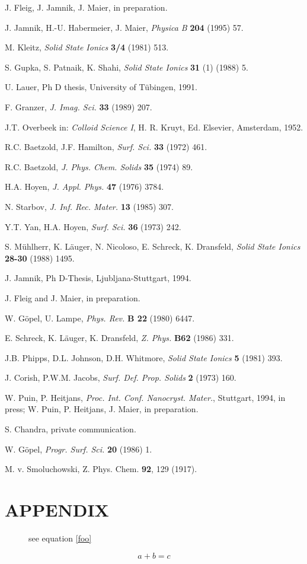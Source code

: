 \documentclass{elsart}
\begin{document}
\begin{thebibliography}{999}
 J. Fleig, J. Jamnik, J. Maier, in preparation. 

 J. Jamnik, H.-U. Habermeier, J. Maier, {\em Physica B\/} {\bf
    204} (1995) 57.   

 M. Kleitz, {\em Solid State Ionics\/} {\bf 3/4} (1981) 513.

 S. Gupka, S. Patnaik, K. Shahi, {\em Solid State Ionics\/} {\bf
    31} (1) (1988) 5. 

 U. Lauer, Ph D thesis, University of T\"ubingen, 1991. 

 F. Granzer, {\em J. Imag. Sci.\/} {\bf 33} (1989) 207.


 J.T. Overbeek in: {\em Colloid Science I\/}, H. R. Kruyt, Ed. 
Elsevier, Amsterdam, 1952.

 R.C. Baetzold, J.F. Hamilton, {\em Surf. Sci.\/} {\bf 33} (1972)
  461.  

 R.C. Baetzold, {\em J. Phys. Chem. Solids\/} {\bf 35} (1974) 89. 

 H.A. Hoyen, {\em J. Appl. Phys.} {\bf 47\/} (1976) 3784.

 N. Starbov, {\em J. Inf. Rec. Mater.\/} {\bf 13} (1985) 307.

 Y.T. Yan, H.A. Hoyen, {\em Surf. Sci.\/} {\bf 36} (1973) 242.

 S. M\"uhlherr, K. L\"auger, N. Nicoloso, E. Schreck, K.
Dransfeld, {\em Solid State Ionics\/} {\bf 28-30} (1988) 1495.

 J. Jamnik, Ph D-Thesis, Ljubljana-Stuttgart, 1994.

 J. Fleig and J. Maier, in preparation.

 W. G\"opel, U. Lampe, {\em Phys. Rev.\/} {\bf B 22} (1980) 6447. 

 E. Schreck, K. L\"auger, K. Dransfeld, {\em Z. Phys.\/} {\bf
  B62} (1986) 331. 

 J.B. Phipps, D.L. Johnson, D.H. Whitmore, {\em Solid State
Ionics\/} {\bf 5} (1981) 393.  

 J. Corish, P.W.M. Jacobs, {\em Surf. Def. Prop. Solids\/} {\bf
  2} (1973) 160.

  W. Puin, P. Heitjans, {\em Proc. Int. Conf. Nanocryst. Mater.},
  Stuttgart, 1994, in press; W. Puin, P. Heitjans, J. Maier, in preparation.

 S. Chandra, private communication. 

 W. G\"opel, {\em Progr. Surf. Sci.\/} {\bf 20} (1986) 1.

\bibitem{}  M. v. Smoluchowski, Z. Phys. Chem. {\bf 92}, 129 (1917).

\end{thebibliography}
\appendix
\section{APPENDIX}
\begin{figure}
\caption{see equation \ref{foo}}
\end{figure}
\begin{equation}
a + b = c
  \label{foo}
\end{equation}
\end{document}
